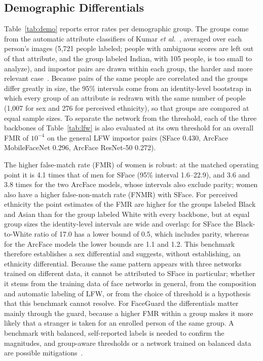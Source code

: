 \documentclass{ieeeaccess}
\begin{document}
\subsection{Demographic Differentials}\label{sec:demo}
Table~\ref{tab:demo} reports error rates per demographic group. The groups come from the automatic attribute classifiers of Kumar \emph{et al.}~\cite{kumar2011attributes}, averaged over each person's images (5,721 people labeled; people with ambiguous scores are left out of that attribute, and the group labeled Indian, with 105 people, is too small to analyze), and impostor pairs are drawn within each group, the harder and more relevant case~\cite{drozdowski2020bias}. Because pairs of the same people are correlated and the groups differ greatly in size, the 95\% intervals come from an identity-level bootstrap in which every group of an attribute is redrawn with the same number of people (1,007 for sex and 276 for perceived ethnicity), so that groups are compared at equal sample sizes. To separate the network from the threshold, each of the three backbones of Table~\ref{tab:lfw} is also evaluated at its own threshold for an overall FMR of $10^{-4}$ on the general LFW impostor pairs (SFace 0.430, ArcFace MobileFaceNet 0.296, ArcFace ResNet-50 0.272).

The higher false-match rate (FMR) of women is robust: at the matched operating point it is 4.1 times that of men for SFace (95\% interval 1.6--22.9), and 3.6 and 3.8 times for the two ArcFace models, whose intervals also exclude parity; women also have a higher false-non-match rate (FNMR) with SFace. For perceived ethnicity the point estimates of the FMR are higher for the groups labeled Black and Asian than for the group labeled White with every backbone, but at equal group sizes the identity-level intervals are wide and overlap: for SFace the Black-to-White ratio of 17.0 has a lower bound of 0.5, which includes parity, whereas for the ArcFace models the lower bounds are 1.1 and 1.2. This benchmark therefore establishes a sex differential and suggests, without establishing, an ethnicity differential. Because the same pattern appears with three networks trained on different data, it cannot be attributed to SFace in particular; whether it stems from the training data of face networks in general, from the composition and automatic labeling of LFW, or from the choice of threshold is a hypothesis that this benchmark cannot resolve. For FaceGuard the differentials matter mainly through the guard, because a higher FMR within a group makes it more likely that a stranger is taken for an enrolled person of the same group. A benchmark with balanced, self-reported labels is needed to confirm the magnitudes, and group-aware thresholds or a network trained on balanced data are possible mitigations~\cite{drozdowski2020bias}.
\end{document}
